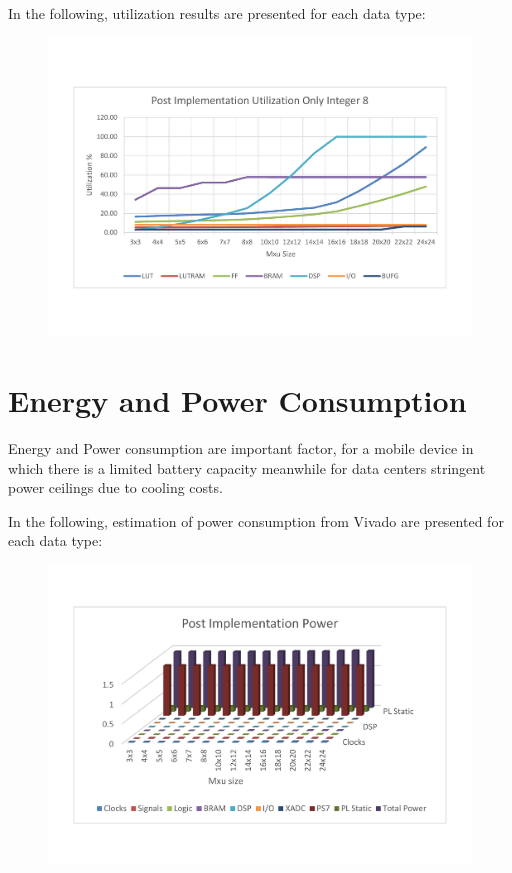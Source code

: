 In the following, utilization results are presented for each data type:
\begin{figure}[!htbp]
\centering
\captionsetup{justification=centering}
\includegraphics[scale=0.5,angle=0]{./figure/graphs/graph_utilization.pdf}
\label{fig:ut8bit}
\end{figure}

\newpage
\section{Energy and Power Consumption}
Energy and Power consumption are important factor, for a mobile device in which there is a limited battery capacity meanwhile for data centers stringent power ceilings due to cooling costs.

In the following, estimation of power consumption from Vivado are presented for each data type:

\begin{figure}[!htbp]
\centering
\captionsetup{justification=centering}
\includegraphics[scale=0.5,angle=0]{./figure/graphs/graph_power.pdf}
\label{fig:pow8bit}
\end{figure}

